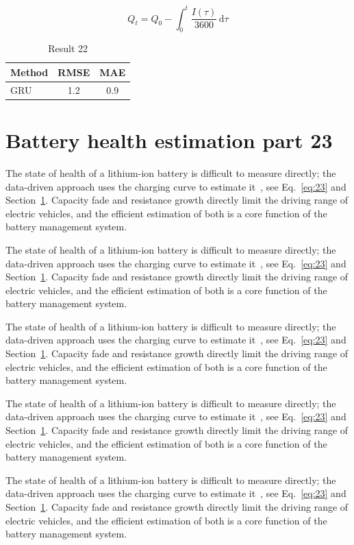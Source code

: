 \documentclass[11pt]{article}
\begin{document}
\begin{equation}\label{eq:22}
  Q_t = Q_0 - \int_0^t \frac{I(\tau)}{3600}\,\mathrm{d}\tau
\end{equation}
\begin{table}[h]\centering\begin{tabular}{lcc}\toprule Method & RMSE & MAE\\\midrule GRU & 1.2 & 0.9\\\bottomrule\end{tabular}\caption{Result 22}\end{table}

\section{Battery health estimation part 23}\label{sec:23}
The state of health of a lithium-ion battery is difficult to measure directly; the data-driven approach uses the charging curve to estimate it~\cite{a2020}, see Eq.~\eqref{eq:23} and Section~\ref{sec:23}. Capacity fade and resistance growth directly limit the driving range of electric vehicles, and the efficient estimation of both is a core function of the battery management system.

The state of health of a lithium-ion battery is difficult to measure directly; the data-driven approach uses the charging curve to estimate it~\cite{a2020}, see Eq.~\eqref{eq:23} and Section~\ref{sec:23}. Capacity fade and resistance growth directly limit the driving range of electric vehicles, and the efficient estimation of both is a core function of the battery management system.

The state of health of a lithium-ion battery is difficult to measure directly; the data-driven approach uses the charging curve to estimate it~\cite{a2020}, see Eq.~\eqref{eq:23} and Section~\ref{sec:23}. Capacity fade and resistance growth directly limit the driving range of electric vehicles, and the efficient estimation of both is a core function of the battery management system.

The state of health of a lithium-ion battery is difficult to measure directly; the data-driven approach uses the charging curve to estimate it~\cite{a2020}, see Eq.~\eqref{eq:23} and Section~\ref{sec:23}. Capacity fade and resistance growth directly limit the driving range of electric vehicles, and the efficient estimation of both is a core function of the battery management system.

The state of health of a lithium-ion battery is difficult to measure directly; the data-driven approach uses the charging curve to estimate it~\cite{a2020}, see Eq.~\eqref{eq:23} and Section~\ref{sec:23}. Capacity fade and resistance growth directly limit the driving range of electric vehicles, and the efficient estimation of both is a core function of the battery management system.
\end{document}
